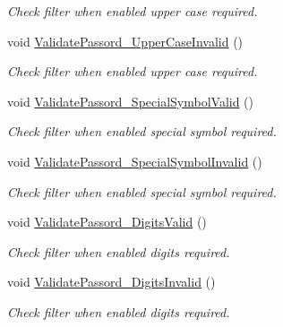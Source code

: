 \begin{DoxyCompactItemize}
\begin{DoxyCompactList}\small\item\em Check filter when enabled upper case required. \end{DoxyCompactList}\item 
void \mbox{\hyperlink{class_a_c_tests_1_1_tests_1_1_regex_a04621729e38f6f113afca8c6bf109a43}{Validate\+Passord\+\_\+\+Upper\+Case\+Invalid}} ()
\begin{DoxyCompactList}\small\item\em Check filter when enabled upper case required. \end{DoxyCompactList}\item 
void \mbox{\hyperlink{class_a_c_tests_1_1_tests_1_1_regex_a85b89d5c2b6617c1e6243796dd3b962b}{Validate\+Passord\+\_\+\+Special\+Symbol\+Valid}} ()
\begin{DoxyCompactList}\small\item\em Check filter when enabled special symbol required. \end{DoxyCompactList}\item 
void \mbox{\hyperlink{class_a_c_tests_1_1_tests_1_1_regex_a48b10eb6ffde7837698bf868cd8acc70}{Validate\+Passord\+\_\+\+Special\+Symbol\+Invalid}} ()
\begin{DoxyCompactList}\small\item\em Check filter when enabled special symbol required. \end{DoxyCompactList}\item 
void \mbox{\hyperlink{class_a_c_tests_1_1_tests_1_1_regex_add6c36ef4c2dc9dc468e683727b685d8}{Validate\+Passord\+\_\+\+Digits\+Valid}} ()
\begin{DoxyCompactList}\small\item\em Check filter when enabled digits required. \end{DoxyCompactList}\item 
void \mbox{\hyperlink{class_a_c_tests_1_1_tests_1_1_regex_ac7fde0aa24283986ac1c70d54bd97f9e}{Validate\+Passord\+\_\+\+Digits\+Invalid}} ()
\begin{DoxyCompactList}\small\item\em Check filter when enabled digits required. \end{DoxyCompactList}\end{DoxyCompactItemize}
